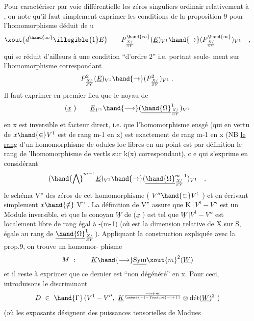 
Pour caractériser par voie différentielle  les  zéros singuliers ordinair
relativement à ,  on note qu'il faut simplement exprimer  les conditions
de la proposition 9  pour  l'homomorphisme  déduit de u
\[ \xout{d^{\hand{\infty}}\illegible{1}E} \qquad P^{\hand{\infty}}_{X/\over{S}{Y}}(\underline{E})_{V^1}\hand{\to}(P^{\hand{\infty}}_{X/\over{S}{Y}})_{V^1} \quad , \]
qui se réduit d'ailleurs à une condition  ``d'ordre 2'' i.e. portant seule-%
ment sur l'homomorphisme correspondant
\[ P^{2}_{X/\over{S}{Y}}(\underline{E})_{V^1}\hand{\to}(P^{2}_{X/\over{S}{Y}})_{V^1} \ . \]
Il faut exprimer en premier lieu  que  le noyau  de
\[ (\underline{x}\ ) \qquad \underline{E}_{V^1} \hand{\longrightarrow} (\underline{\hand{\Omega}}^{1}_{X/\over{S}{Y}})_{V^1} \]
en x est inversible et facteur direct, i.e. que l'homomorphisme ensgé
(qui en vertu de  $x\hand{\in} V^1$ est  de rang  m-1 en x) est exactement de rang
\margin{(} m-1 en x  (NB \uline{le rang} d'un  homomorphisme de odules loc libres en un
point est par définition le rang de 'lhomomorphisme de vectls sur k(x)
correspondant), c e qui s'exprime en considérant
\[ (\hand{\bigwedge}^{m-1} \underline{E})_{V^1}\hand{\to}(\underline{\hand{\Omega}}^{m-1}_{X/\over{S}{Y}})_{V^1} \quad , \]
le  schéma  V'' des zéros de cet homomorphisme  ( $V''\hand{\subset} V^1$ )  et en écrivant
simplement $x\hand{\notin}$ V'' .  La définition de V'' assure que  K $|V^1-V''$  est un
Module inversible,  et que  le conoyau  $\underline{W}$  de ($\underline{x}$ )  est tel que
$\underline{W}\,|V^1-V''$  est  localement libre de rang égal à  -(m-1)  (où  est la
dimension relative de X sur S, égale au rang de $\underline{\hand{\Omega}}^{1}_{X/\over{S}{Y}}$).  Appliquant la
construction expliquée avec la prop.9\hand{$^{*}$}, on trouve  un homomor-%
phisme
\[ M\ : \qquad \underline{K} \hand{\longrightarrow} \underline{\mathrm{Sym}}\xout{m}^{2}(\underline{W}) \]
et il reste à exprimer que ce dernier est ``non dégénéré'' en x. Pour ceci,
introduisons le  discriminant
\[ D\ \in\ \hand{\Gamma}\,(V^1-V'',\ \underline{K}^{-n+m\over{\unsure{+|-}}{\unsure{-|+}}1}\otimes \text{dét}(\underline{W})^{2}\ ) \]
(où les exposants désignent des puissances tensorielles de Modues

